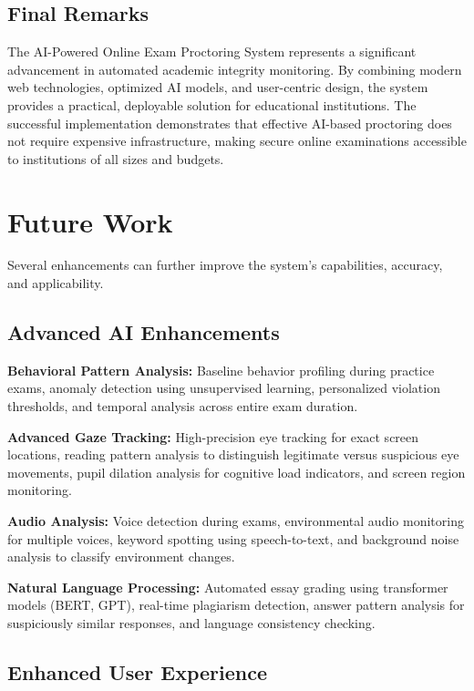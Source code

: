 \subsection{Final Remarks}

The AI-Powered Online Exam Proctoring System represents a significant advancement in automated academic integrity monitoring. By combining modern web technologies, optimized AI models, and user-centric design, the system provides a practical, deployable solution for educational institutions. The successful implementation demonstrates that effective AI-based proctoring does not require expensive infrastructure, making secure online examinations accessible to institutions of all sizes and budgets.

\section{Future Work}

Several enhancements can further improve the system's capabilities, accuracy, and applicability.

\subsection{Advanced AI Enhancements}

\textbf{Behavioral Pattern Analysis:} Baseline behavior profiling during practice exams, anomaly detection using unsupervised learning, personalized violation thresholds, and temporal analysis across entire exam duration.

\textbf{Advanced Gaze Tracking:} High-precision eye tracking for exact screen locations, reading pattern analysis to distinguish legitimate versus suspicious eye movements, pupil dilation analysis for cognitive load indicators, and screen region monitoring.

\textbf{Audio Analysis:} Voice detection during exams, environmental audio monitoring for multiple voices, keyword spotting using speech-to-text, and background noise analysis to classify environment changes.

\textbf{Natural Language Processing:} Automated essay grading using transformer models (BERT, GPT), real-time plagiarism detection, answer pattern analysis for suspiciously similar responses, and language consistency checking.

\subsection{Enhanced User Experience}

